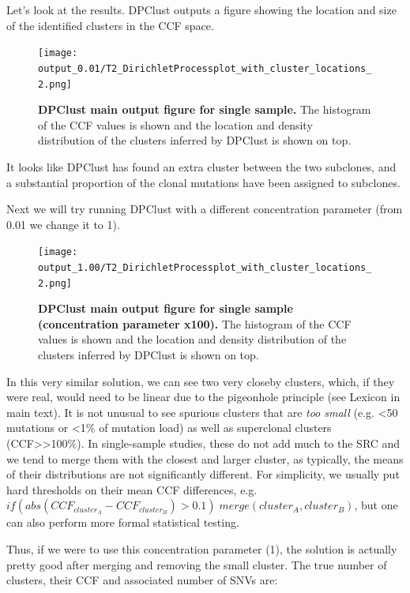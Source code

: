 \documentclass[]{article}
\begin{document}
Let's look at the results. DPClust outputs a figure showing the location
and size of the identified clusters in the CCF space.

\begin{figure}[H]
  \centering
  \texttt{[image: output\_0.01/T2\_DirichletProcessplot\_with\_cluster\_locations\_2.png]}
  \caption{\textbf{DPClust main output figure for single sample.}
  The histogram of the CCF values is shown and the location and
  density distribution of the clusters inferred by DPClust is shown on top.}
  \label{Figure6}
\end{figure}

It looks like DPClust has found an extra cluster between the two
subclones, and a substantial proportion of the clonal mutations have
been assigned to subclones.

Next we will try running DPClust with a different concentration
parameter (from 0.01 we change it to 1).

\begin{figure}[H]
  \centering
  \texttt{[image: output\_1.00/T2\_DirichletProcessplot\_with\_cluster\_locations\_2.png]}
  \caption{\textbf{DPClust main output figure for single sample (concentration parameter x100).}
  The histogram of the CCF values is shown and the location and
  density distribution of the clusters inferred by DPClust is shown on top.}
  \label{Figure7}
\end{figure}

In this very similar solution, we can see two very closeby clusters,
which, if they were real, would need to be linear due to the pigeonhole
principle (see Lexicon in main text). It is not unusual to see spurious
clusters that are \emph{too small} (e.g. \textless{}50 mutations or
\textless{}1\% of mutation load) as well as superclonal clusters
(CCF\textgreater{}\textgreater{}100\%). In single-sample studies, these
do not add much to the SRC and we tend to merge them with the closest
and larger cluster, as typically, the means of their distributions are
not significantly different. For simplicity, we usually put hard
thresholds on their mean CCF differences, e.g.
\(if(abs(CCF_{cluster_A}-CCF_{cluster_B})>0.1)\;merge(cluster_A,cluster_B)\),
but one can also perform more formal statistical testing.

Thus, if we were to use this concentration parameter (1), the solution
is actually pretty good after merging and removing the small cluster.
The true number of clusters, their CCF and associated number of SNVs
are:
\end{document}
